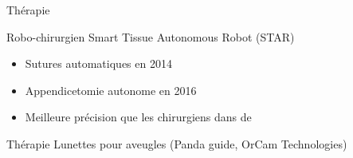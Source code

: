 \begin{frame}{Thérapie}
  \begin{minipage}{0.49\linewidth}
    Robo-chirurgien Smart Tissue Autonomous Robot (STAR)
    \begin{itemize}
      \item Sutures automatiques en 2014
      \item Appendicetomie autonome en 2016
      \item Meilleure précision que les chirurgiens dans de 
      \end{itemize}
  \end{minipage}
  \begin{minipage}{0.49\linewidth}
  \end{minipage}
\end{frame}

\begin{frame}{Thérapie}
  Lunettes pour aveugles (Panda guide, OrCam Technologies)
\end{frame}
